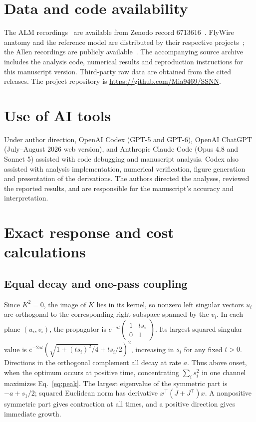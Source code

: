 \documentclass[aps,10pt,onecolumn,superscriptaddress,nofootinbib,longbibliography,
  amsmath,amssymb,floatfix]{revtex4-2}
\begin{document}
\section*{Data and code availability}
The ALM recordings~\cite{chen2021modularity} are available from
Zenodo record 6713616~\cite{chenli2022dataset}. FlyWire anatomy and the reference model are
distributed by their respective projects~\cite{dorkenwald2024,shiu2024};
the Allen recordings are publicly available~\cite{siegle2021visual}.
The accompanying source archive includes the analysis code, numerical
results and reproduction instructions for this manuscript version.
Third-party raw data are obtained from the cited releases.
The project repository is
\url{https://github.com/Mia9469/SSNN}.

\section*{Use of AI tools}
Under author direction, OpenAI Codex (GPT-5 and GPT-6), OpenAI
ChatGPT (July--August 2026 web version), and Anthropic Claude Code
(Opus 4.8 and Sonnet 5) assisted with code debugging and manuscript
analysis. Codex also assisted with analysis implementation, numerical
verification, figure generation and presentation of the derivations.
The authors directed the analyses, reviewed the reported results, and
are responsible for the manuscript's accuracy and interpretation.

\appendix

\section{Exact response and cost calculations}
\label{app:proof}

\subsection{Equal decay and one-pass coupling}

Since \(K^2=0\), the image of \(K\) lies in its kernel, so nonzero left
singular vectors \(u_i\) are orthogonal to the corresponding right
subspace spanned by the \(v_i\). In each plane \((u_i,v_i)\),
the propagator is \(e^{-at}\left(\begin{smallmatrix}1&ts_i\\0&1
\end{smallmatrix}\right)\). Its largest squared singular value is
\(e^{-2at}(\sqrt{1+(ts_i)^2/4}+ts_i/2)^2\), increasing in \(s_i\)
for any fixed \(t>0\). Directions in the orthogonal complement all
decay at rate \(a\). Thus above onset, when the optimum occurs at positive time,
concentrating \(\sum_i s_i^2\) in one channel maximizes
Eq.~\eqref{eq:peak}. The largest eigenvalue of the symmetric part
is \(-a+s_1/2\); squared Euclidean norm has derivative
\(x^\top(J+J^\top)x\). A nonpositive symmetric part gives contraction
at all times, and a positive direction gives immediate growth.
\end{document}
